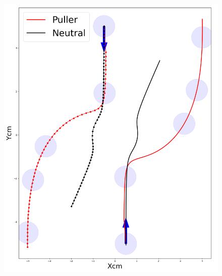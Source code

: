\documentclass[graybox]{svmult}
\begin{document}
\begin{figure}
	\centering

        \includegraphics[scale=0.2]{img-squirmer-squirmers.png}
    

\end{figure}
\end{document}
